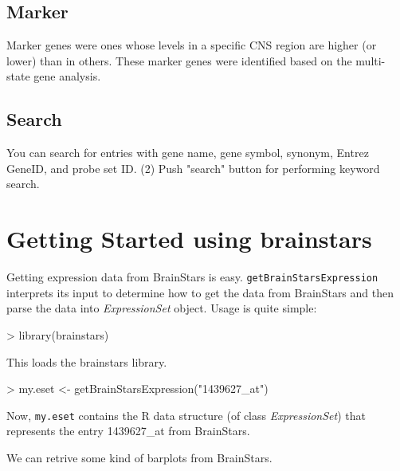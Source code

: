 \documentclass[12pt,fullpage]{article}
\newcommand{\Rfunction}[1]{{\texttt{#1}}}
\newcommand{\Robject}[1]{{\texttt{#1}}}
\newcommand{\Rclass}[1]{{\textit{#1}}}
\begin{document}
\subsection{Marker}
Marker genes were ones whose levels in a specific CNS region are higher (or lower) than in others. These marker genes were identified based on the multi-state gene analysis.

\subsection{Search}
 You can search for entries with gene name, gene symbol, synonym, Entrez GeneID, and probe set ID. (2) Push "search" button for performing keyword search.

\section{Getting Started using brainstars}

Getting expression data from BrainStars is easy.  \Rfunction{getBrainStarsExpression} interprets its input to determine how to get the data from BrainStars and then parse the data into \Rclass{ExpressionSet} object.  Usage is quite simple:

\begin{Schunk}
\begin{Sinput}
> library(brainstars)
\end{Sinput}
\end{Schunk}

This loads the brainstars library.

\begin{Schunk}
\begin{Sinput}
> my.eset <- getBrainStarsExpression("1439627_at")
\end{Sinput}
\end{Schunk}

Now, \Robject{my.eset} contains the R data structure (of class \Rclass{ExpressionSet}) that represents the entry 1439627\_at from BrainStars.

We can retrive some kind of barplots from BrainStars.
\end{document}
